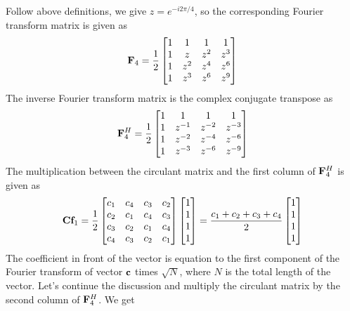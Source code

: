 \documentclass[revised,endfloat]{geophysics}
\begin{document}
Follow above definitions, we give $z = e^{-i 2\pi / 4}$, so the corresponding Fourier transform matrix is given as
\begin{equation}
{\bf F}_4 = \frac{1}{2}\begin{bmatrix}
1 & 1 & 1 & 1 \\
1 & z & z^2 & z^3 \\
1 & z^2 & z^4 & z^6 \\
1 & z^3 & z^6 & z^9 \\
\end{bmatrix}
\end{equation}
The inverse Fourier transform matrix is the complex conjugate transpose as
\begin{equation}
{\bf F}_4^H = \frac{1}{2}\begin{bmatrix}
1 & 1 & 1 & 1 \\
1 & z^{-1} & z^{-2}  & z^{-3}  \\
1 & z^{-2}  & z^{-4}  & z^{-6}  \\
1 & z^{-3}  & z^{-6}  & z^{-9}  \\
\end{bmatrix}
\end{equation}
The multiplication between the circulant matrix and the first column of ${\bf F}_4^H$ is given as
\begin{equation}
{\bf C}{\bf f}_1 = \frac{1}{2}
\begin{bmatrix}
c_1 & c_4 & c_3 & c_2  \\ 
c_2 & c_1 & c_4 & c_3  \\ 
c_3 & c_2 & c_1 & c_4  \\ 
c_4 & c_3 & c_2 & c_1 
\end{bmatrix}
\begin{bmatrix}
1 \\
1 \\
1 \\
1 
\end{bmatrix}
= \frac{c_1+c_2+c_3+c_4}{2}
\begin{bmatrix}
1 \\
1 \\
1 \\
1 
\end{bmatrix}
\end{equation} 
The coefficient in front of the vector is equation to the first component of the Fourier transform of vector ${\bf c}$ times $\sqrt{N}$, where $N$ is the total length of the vector.
Let's continue the discussion and multiply the circulant matrix by the second column of ${\bf F}_4^H$. We get
\end{document}

